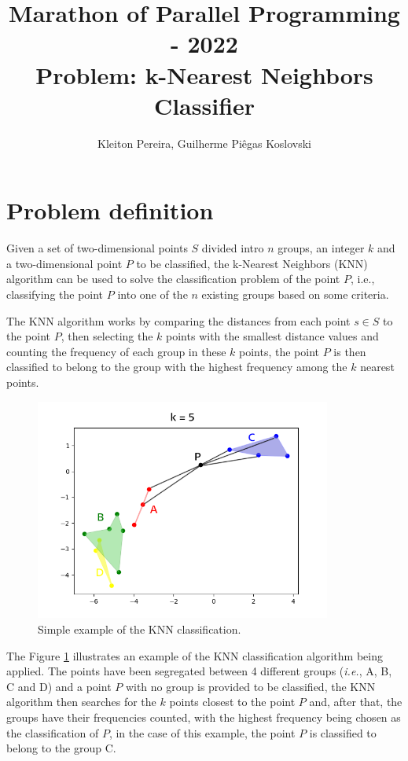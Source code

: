 \documentclass{article}
\title{Marathon of Parallel Programming - 2022\\Problem: k-Nearest Neighbors Classifier}
\author{Kleiton Pereira, Guilherme Piêgas Koslovski}
\begin{document}
\maketitle 

\section*{Problem definition}

Given a set of two-dimensional points $S$ divided intro $n$ groups, an integer $k$ and a two-dimensional point $P$ to be classified, the k-Nearest Neighbors (KNN) algorithm can be used to solve the classification problem of the point $P$, i.e., classifying the point $P$ into one of the $n$ existing groups based on some criteria.

The KNN algorithm works by comparing the distances from each point $s \in S$ to the point $P$, then selecting the $k$ points with the smallest distance values and counting the frequency of each group in these $k$ points, the point $P$ is then classified to belong to the group with the highest frequency among the $k$ nearest points.

\begin{figure}[h!]
\centering
\includegraphics[width=0.8675\textwidth]{input.png}
\caption{Simple example of the KNN classification.}
\label{example}
\end{figure}

The Figure \ref{example} illustrates an example of the KNN classification algorithm being applied. The points have been segregated between 4 different groups (\textit{i.e.}, A, B, C and D) and a point $P$ with no group is provided to be classified, the KNN algorithm then searches for the $k$ points closest to the point $P$ and, after that, the groups have their frequencies counted, with the highest frequency being chosen as the classification of $P$, in the case of this example, the point $P$ is classified to belong to the group C.
\end{document}
